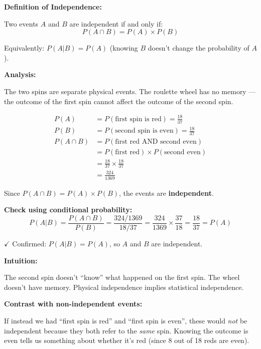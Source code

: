 \documentclass[11pt,a4paper]{article}
\begin{document}
\begin{answer}
\textbf{Definition of Independence:}

Two events $A$ and $B$ are independent if and only if:
\[
P(A \cap B) = P(A) \times P(B)
\]

Equivalently: $P(A|B) = P(A)$ (knowing $B$ doesn't change the probability of $A$).

\vspace{0.3cm}
\textbf{Analysis:}

The two spins are separate physical events. The roulette wheel has no memory — the outcome of the first spin cannot affect the outcome of the second spin.

\begin{align*}
P(A) &= P(\text{first spin is red}) = \frac{18}{37}\\
P(B) &= P(\text{second spin is even}) = \frac{18}{37}\\
P(A \cap B) &= P(\text{first red AND second even})\\
&= P(\text{first red}) \times P(\text{second even})\\
&= \frac{18}{37} \times \frac{18}{37}\\
&= \frac{324}{1369}
\end{align*}

Since $P(A \cap B) = P(A) \times P(B)$, the events are \textbf{independent}.

\vspace{0.3cm}
\textbf{Check using conditional probability:}
\[
P(A|B) = \frac{P(A \cap B)}{P(B)} = \frac{324/1369}{18/37} = \frac{324}{1369} \times \frac{37}{18} = \frac{18}{37} = P(A)
\]

$\checkmark$ Confirmed: $P(A|B) = P(A)$, so $A$ and $B$ are independent.

\vspace{0.3cm}
\textbf{Intuition:}

The second spin doesn't ``know'' what happened on the first spin. The wheel doesn't have memory. Physical independence implies statistical independence.

\vspace{0.3cm}
\textbf{Contrast with non-independent events:}

If instead we had ``first spin is red'' and ``first spin is even'', these would \textit{not} be independent because they both refer to the \textit{same} spin. Knowing the outcome is even tells us something about whether it's red (since 8 out of 18 reds are even).
\end{answer}
\end{document}
